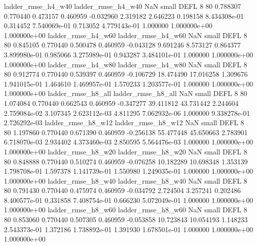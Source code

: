       ladder_rmse_h4_w40       ladder_rmse_h4_w40                   NaN      small     DEFL                 8 80 0.788307       0.770440 0.473157       0.460959   -0.032960      2.319182      2.646223     0.198158   8.434308e-01  0.314452 7.540069e-01     0.713052   4.779143e-01            1.000000    1.000000e+00        1.000000e+00
      ladder_rmse_h4_w60       ladder_rmse_h4_w60                   NaN      small     DEFL                 8 80 0.845105       0.770440 0.500478       0.460959   -0.043128      9.691246      8.573127     0.864377   3.899980e-01  0.985066 3.275989e-01     0.943287   3.484101e-01            1.000000    1.000000e+00        1.000000e+00
      ladder_rmse_h4_w80       ladder_rmse_h4_w80                   NaN      small     DEFL                 8 80 0.912774       0.770440 0.539397       0.460959   -0.106729     18.474490     17.016258     1.309676   1.941015e-01  1.464610 1.469957e-01     1.570233   1.203577e-01            1.000000    1.000000e+00        1.000000e+00
      ladder_rmse_h8_all       ladder_rmse_h8_all                   NaN      small     DEFL                 8 80 1.074084       0.770440 0.662543       0.460959   -0.347277     39.411812     43.731442     2.244604   2.759084e-02  3.107345 2.623112e-03     4.811295   7.062932e-06            1.000000    9.338278e-01        2.726292e-03
      ladder_rmse_h8_w12       ladder_rmse_h8_w12                   NaN      small     DEFL                 8 80 1.197860       0.770440 0.671390       0.460959   -0.256138     55.477448     45.650663     2.783901   6.718070e-03  2.934402 4.373460e-03     2.850595   5.564476e-03            1.000000    1.000000e+00        1.000000e+00
      ladder_rmse_h8_w20       ladder_rmse_h8_w20                   NaN      small     DEFL                 8 80 0.848888       0.770440 0.510274       0.460959   -0.076258     10.182289     10.698348     1.353139   1.798708e-01  1.597378 1.141739e-01     1.550980   1.249035e-01            1.000000    1.000000e+00        1.000000e+00
      ladder_rmse_h8_w40       ladder_rmse_h8_w40                   NaN      small     DEFL                 8 80 0.791430       0.770440 0.475974       0.460959   -0.034792      2.724504      3.257241     0.202486   8.400577e-01  0.331858 7.408754e-01     0.666230   5.072049e-01            1.000000    1.000000e+00        1.000000e+00
      ladder_rmse_h8_w60       ladder_rmse_h8_w60                   NaN      small     DEFL                 8 80 0.853060       0.770440 0.507305       0.460959   -0.053858     10.723843     10.054193     1.148233   2.543373e-01  1.372186 1.738892e-01     1.391930   1.678501e-01            1.000000    1.000000e+00        1.000000e+00
